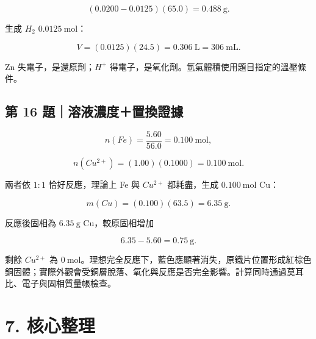 \documentclass[11pt,a4paper]{article}
\begin{document}
\[
(0.0200-0.0125)(65.0)=0.488\ \mathrm g.
\]

生成 \(H_2\) \(0.0125\ \mathrm{mol}\)：

\[
V=(0.0125)(24.5)=0.306\ \mathrm L=306\ \mathrm{mL}.
\]

Zn 失電子，是還原劑；\(H^+\) 得電子，是氧化劑。氫氣體積使用題目指定的溫壓條件。

\subsection{第 16 題｜溶液濃度＋置換證據}\label{ux7b2c-16-ux984cux6eb6ux6db2ux6fc3ux5ea6ux7f6eux63dbux8b49ux64da}

\[
n(Fe)=\frac{5.60}{56.0}=0.100\ \mathrm{mol},
\]

\[
n(Cu^{2+})=(1.00)(0.1000)=0.100\ \mathrm{mol}.
\]

兩者依 \(1:1\) 恰好反應，理論上 Fe 與 \(Cu^{2+}\) 都耗盡，生成 \(0.100\ \mathrm{mol}\) Cu：

\[
m(Cu)=(0.100)(63.5)=6.35\ \mathrm g.
\]

反應後固相為 \(6.35\ \mathrm g\) Cu，較原固相增加

\[
6.35-5.60=0.75\ \mathrm g.
\]

剩餘 \(Cu^{2+}\) 為 \(0\ \mathrm{mol}\)。理想完全反應下，藍色應顯著消失，原鐵片位置形成紅棕色銅固體；實際外觀會受銅層脫落、氧化與反應是否完全影響。計算同時通過莫耳比、電子與固相質量帳檢查。

\section{7. 核心整理}\label{ux6838ux5fc3ux6574ux7406}
\end{document}
